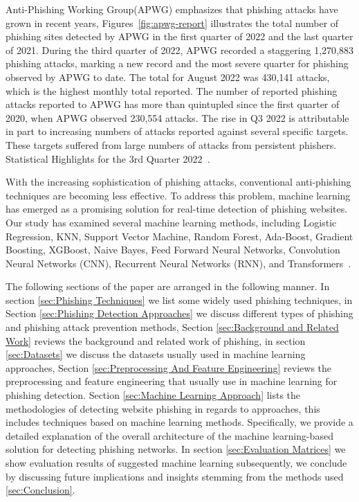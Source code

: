\documentclass[final]{cvpr}
\begin{document}
Anti-Phishing Working Group(APWG) emphasizes that phishing attacks have grown in recent years, Figures~\ref{fig:apwg-report} illustrates the total number of phishing sites detected by APWG in the first quarter of 2022 and the last quarter of 2021. During the third quarter of 2022, APWG recorded a staggering 1,270,883 phishing attacks, marking a new record and the most severe quarter for phishing observed by APWG to date. The total for August 2022 was 430,141 attacks, which is the highest monthly total reported. The number of reported phishing attacks reported to APWG has more than quintupled since the first quarter of 2020, when APWG observed 230,554 attacks. The rise in Q3 2022 is attributable in part to increasing numbers of attacks reported against several specific targets. These targets suffered from large numbers of attacks from persistent phishers. Statistical Highlights for the 3rd Quarter 2022~\cite{APWG-Report}.

With the increasing sophistication of phishing attacks, conventional anti-phishing techniques are becoming less effective. To address this problem, machine learning has emerged as a promising solution for real-time detection of phishing websites. Our study has examined several machine learning methods, including Logistic Regression, KNN, Support Vector Machine, Random Forest, Ada-Boost, Gradient Boosting, XGBoost, Naive Bayes, Feed Forward Neural Networks, Convolution Neural Networks (CNN), Recurrent Neural Networks (RNN), and Transformers~\cite{Machine-learning-algorithms}. 

The following sections of the paper are arranged in the following manner. In section \ref{sec:Phishing Techniques} we list some
widely used phishing techniques,  in Section \ref{sec:Phishing Detection Approaches} we discuss different types of phishing and phishing attack prevention methods, Section \ref{sec:Background and Related Work} reviews the background and related work of phishing, in section \ref{sec:Datasets} we discuss the datasets usually used in machine learning approaches, Section \ref{sec:Preprocessing And Feature Engineering} reviews the preprocessing and feature engineering that usually use in machine learning for phishing detection. Section \ref{sec:Machine Learning Approach} lists the methodologies of detecting website phishing in regards to approaches, this includes techniques based on machine learning methods. Specifically, we provide a detailed explanation of the overall architecture of the machine learning-based solution for detecting phishing networks. In section \ref{sec:Evaluation Matrices}
 we show evaluation results of suggested machine learning subsequently, we conclude by discussing future implications and insights stemming from the methods used \ref{sec:Conclusion}.
\end{document}

